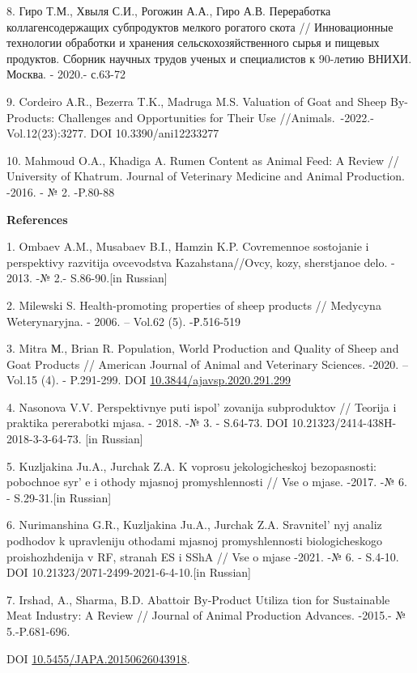 8. Гиро Т.М., Хвыля С.И., Рогожин А.А., Гиро А.В. Переработка
коллагенсодержащих субпродуктов мелкого рогатого скота // Инновационные
технологии обработки и хранения сельскохозяйственного сырья и пищевых
продуктов. Сборник научных трудов ученых и специалистов к 90-летию
ВНИХИ. Москва. - 2020.- с.63-72

9. Cordeiro A.R., Bezerra T.K., Madruga M.S. Valuation of Goat and Sheep
By-Products: Challenges and Opportunities for Their Use
//Animals.~-2022.-Vol.12(23):3277. DOI 10.3390/ani12233277

10. Mahmoud O.A., Khadiga A. Rumen Content as Animal Feed: A Review //
University of Khatrum. Journal of Veterinary Medicine and Animal
Production. -2016. - № 2. -P.80-88

{\bfseries References}

1. Ombaev A.M., Musabaev B.I., Hamzin K.P. Covremennoe sostojanie i
perspektivy razvitija ovcevodstva Kazahstana//Ovcy, kozy, sherstjanoe
delo. - 2013. -№ 2.- S.86-90.{[}in Russian{]}

2. Milewski S. Health-promoting properties of sheep products // Medycyna
Weterynaryjna. - 2006. -- Vol.62 (5). -Р.516-519

3. Mitra М., Brian R. Population, World Production and Quality of Sheep
and Goat Products // American Journal of Animal and Veterinary Sciences.
-2020. -- Vol.15 (4). - P.291-299. DOI
\href{https://doi.org/10.3844/ajavsp.2020.291.299}{10.3844/ajavsp.2020.291.299}

4. Nasonova V.V. Perspektivnye puti ispol' zovanija
subproduktov // Teorija i praktika pererabotki mjasa. - 2018. -№ 3. -
S.64-73. DOI 10.21323/2414-438H-2018-3-3-64-73. {[}in Russian{]}

5. Kuzljakina Ju.A., Jurchak Z.A. K voprosu jekologicheskoj
bezopasnosti: pobochnoe syr' e i othody mjasnoj
promyshlennosti // Vse o mjase. -2017. -№ 6. - S.29-31.{[}in Russian{]}

6. Nurimanshina G.R., Kuzljakina Ju.A., Jurchak Z.A.
Sravnitel' nyj analiz podhodov k upravleniju othodami
mjasnoj promyshlennosti biologicheskogo proishozhdenija v RF, stranah ES
i SShA // Vse o mjase -2021. -№ 6. - S.4-10. DOI
10.21323/2071-2499-2021-6-4-10.{[}in Russian{]}

7. Irshad, A., Sharma, B.D. Abattoir By‑Product Utiliza tion for
Sustainable Meat Industry: A Review // Journal of Animal Production
Advances. -2015.- № 5.-P.681-696.

DOI
\href{https://doi.org/10.5455/JAPA.20150626043918}{10.5455/JAPA.20150626043918}.


